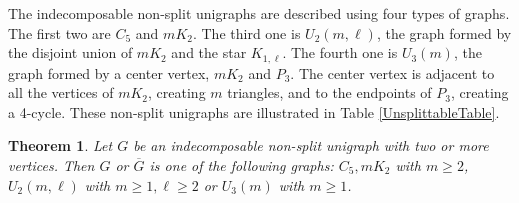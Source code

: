 \documentclass[11pt]{article}
\newtheorem{theorem}[df]{Theorem}
\newtheorem{proposition}[df]{Proposition}
\begin{document}
	


	



   
   





The  indecomposable non-split unigraphs are described using four types of  graphs.  The first two  are $C_5$ and $mK_2$.   The third one is  $U_2(m, \ell)$, the graph formed by the disjoint union of $mK_2$ and the star $K_{1, \ell}$.  The fourth one is $U_3(m)$, the graph formed by a center vertex, $mK_2$ and $P_3$.  The center vertex is adjacent to all the vertices of $mK_2$, creating $m$ triangles, and to the endpoints of $P_3$, creating a 4-cycle.   These non-split unigraphs are illustrated in Table \ref{UnsplittableTable}.




\begin{theorem}
 \label{Tyshkevich-unsplittable}
 {\bf \cite{Ty00}} Let $G$ be an indecomposable non-split unigraph with two or more vertices.  Then $G$ or $\overline{G}$ is one of the following graphs: 
 $C_5, m K_2$ with $m \ge 2$, $ U_2(m,\ell)$ with $m \ge 1, \ell \ge 2$ or $U_3(m)$ with $m \ge 1$. 
 \end{theorem}
 
\end{document}
